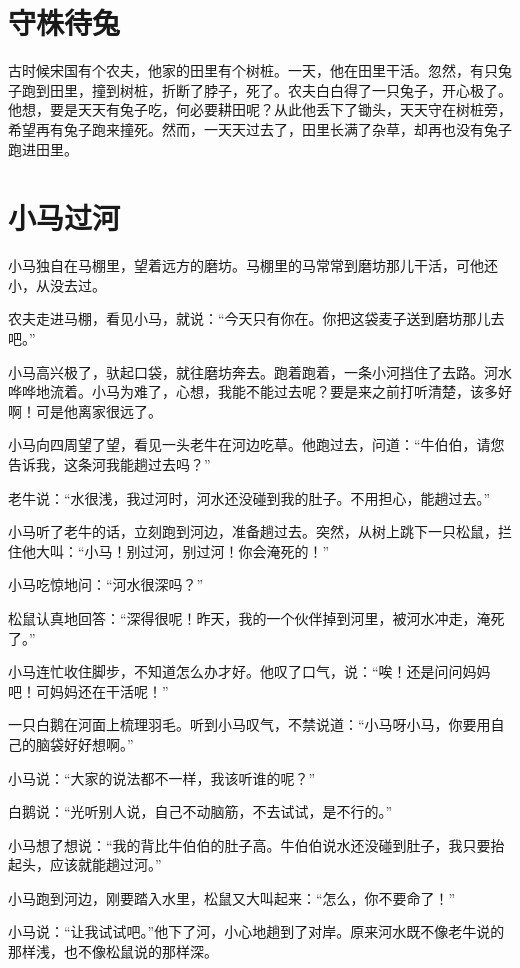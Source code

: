 \documentclass[12pt,UTF-8,openany]{ctexbook}
\begin{document}
\chapter{守株待兔}

\begin{large}
    
    古时候宋国有个农夫，他家的田里有个树桩。一天，他在田里干活。忽然，有只兔子跑到田里，撞到树桩，折断了脖子，死了。农夫白白得了一只兔子，开心极了。他想，要是天天有兔子吃，何必要耕田呢？从此他丢下了锄头，天天守在树桩旁，希望再有兔子跑来撞死。然而，一天天过去了，田里长满了杂草，却再也没有兔子跑进田里。
    
\end{large}



\chapter{小马过河}

\begin{large}
    
    小马独自在马棚里，望着远方的磨坊。马棚里的马常常到磨坊那儿干活，可他还小，从没去过。
    
    农夫走进马棚，看见小马，就说：“今天只有你在。你把这袋麦子送到磨坊那儿去吧。”
    
    小马高兴极了，驮起口袋，就往磨坊奔去。跑着跑着，一条小河挡住了去路。河水哗哗地流着。小马为难了，心想，我能不能过去呢？要是来之前打听清楚，该多好啊！可是他离家很远了。
    
    小马向四周望了望，看见一头老牛在河边吃草。他跑过去，问道：“牛伯伯，请您告诉我，这条河我能趟过去吗？”
    
    老牛说：“水很浅，我过河时，河水还没碰到我的肚子。不用担心，能趟过去。”
    
    小马听了老牛的话，立刻跑到河边，准备趟过去。突然，从树上跳下一只松鼠，拦住他大叫：“小马！别过河，别过河！你会淹死的！”
    
    小马吃惊地问：“河水很深吗？”
    
    松鼠认真地回答：“深得很呢！昨天，我的一个伙伴掉到河里，被河水冲走，淹死了。”
    
    小马连忙收住脚步，不知道怎么办才好。他叹了口气，说：“唉！还是问问妈妈吧！可妈妈还在干活呢！”
    
    一只白鹅在河面上梳理羽毛。听到小马叹气，不禁说道：“小马呀小马，你要用自己的脑袋好好想啊。”
    
    小马说：“大家的说法都不一样，我该听谁的呢？”
    
    白鹅说：“光听别人说，自己不动脑筋，不去试试，是不行的。”
    
    小马想了想说：“我的背比牛伯伯的肚子高。牛伯伯说水还没碰到肚子，我只要抬起头，应该就能趟过河。”
    
    小马跑到河边，刚要踏入水里，松鼠又大叫起来：“怎么，你不要命了！”
    
    小马说：“让我试试吧。”他下了河，小心地趟到了对岸。原来河水既不像老牛说的那样浅，也不像松鼠说的那样深。
    
\end{large}
\end{document}
